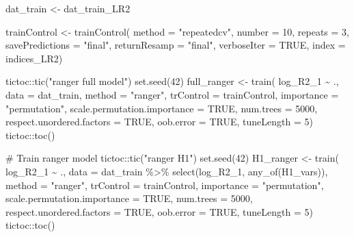 \documentclass[
  letterpaper,
  DIV=11,
  numbers=noendperiod]{scrreprt}
\newenvironment{Shaded}{\begin{snugshade}}{\end{snugshade}}
\newcommand{\AttributeTok}[1]{\textcolor[rgb]{0.40,0.45,0.13}{#1}}
\newcommand{\CommentTok}[1]{\textcolor[rgb]{0.37,0.37,0.37}{#1}}
\newcommand{\ConstantTok}[1]{\textcolor[rgb]{0.56,0.35,0.01}{#1}}
\newcommand{\DecValTok}[1]{\textcolor[rgb]{0.68,0.00,0.00}{#1}}
\newcommand{\FunctionTok}[1]{\textcolor[rgb]{0.28,0.35,0.67}{#1}}
\newcommand{\NormalTok}[1]{\textcolor[rgb]{0.00,0.23,0.31}{#1}}
\newcommand{\OtherTok}[1]{\textcolor[rgb]{0.00,0.23,0.31}{#1}}
\newcommand{\SpecialCharTok}[1]{\textcolor[rgb]{0.37,0.37,0.37}{#1}}
\newcommand{\StringTok}[1]{\textcolor[rgb]{0.13,0.47,0.30}{#1}}
\begin{document}
\begin{Shaded}
\begin{Highlighting}[]
\NormalTok{dat\_train }\OtherTok{\textless{}{-}}\NormalTok{ dat\_train\_LR2}

\NormalTok{trainControl }\OtherTok{\textless{}{-}} \FunctionTok{trainControl}\NormalTok{(}
    \AttributeTok{method =} \StringTok{"repeatedcv"}\NormalTok{,}
    \AttributeTok{number =} \DecValTok{10}\NormalTok{,}
    \AttributeTok{repeats =} \DecValTok{3}\NormalTok{,}
    \AttributeTok{savePredictions =} \StringTok{"final"}\NormalTok{,}
    \AttributeTok{returnResamp =} \StringTok{"final"}\NormalTok{,}
    \AttributeTok{verboseIter =} \ConstantTok{TRUE}\NormalTok{,}
    \AttributeTok{index =}\NormalTok{ indices\_LR2)}

\NormalTok{tictoc}\SpecialCharTok{::}\FunctionTok{tic}\NormalTok{(}\StringTok{"ranger full model"}\NormalTok{)}
\FunctionTok{set.seed}\NormalTok{(}\DecValTok{42}\NormalTok{)}
\NormalTok{full\_ranger }\OtherTok{\textless{}{-}} \FunctionTok{train}\NormalTok{(}
\NormalTok{    log\_R2\_1 }\SpecialCharTok{\textasciitilde{}}\NormalTok{ .,}
    \AttributeTok{data =}\NormalTok{ dat\_train,}
    \AttributeTok{method =} \StringTok{"ranger"}\NormalTok{,}
    \AttributeTok{trControl =}\NormalTok{ trainControl,}
    \AttributeTok{importance =} \StringTok{"permutation"}\NormalTok{,}
    \AttributeTok{scale.permutation.importance =} \ConstantTok{TRUE}\NormalTok{,}
    \AttributeTok{num.trees =} \DecValTok{5000}\NormalTok{,}
    \AttributeTok{respect.unordered.factors =} \ConstantTok{TRUE}\NormalTok{,}
    \AttributeTok{oob.error =} \ConstantTok{TRUE}\NormalTok{,}
    \AttributeTok{tuneLength =} \DecValTok{5}\NormalTok{)}
\NormalTok{tictoc}\SpecialCharTok{::}\FunctionTok{toc}\NormalTok{()}


\CommentTok{\# Train ranger model}
\NormalTok{tictoc}\SpecialCharTok{::}\FunctionTok{tic}\NormalTok{(}\StringTok{"ranger H1"}\NormalTok{)}
\FunctionTok{set.seed}\NormalTok{(}\DecValTok{42}\NormalTok{)}
\NormalTok{H1\_ranger }\OtherTok{\textless{}{-}} \FunctionTok{train}\NormalTok{(}
\NormalTok{    log\_R2\_1 }\SpecialCharTok{\textasciitilde{}}\NormalTok{ .,}
    \AttributeTok{data =}\NormalTok{ dat\_train }\SpecialCharTok{\%\textgreater{}\%} \FunctionTok{select}\NormalTok{(log\_R2\_1, }\FunctionTok{any\_of}\NormalTok{(H1\_vars)),}
    \AttributeTok{method =} \StringTok{"ranger"}\NormalTok{,}
    \AttributeTok{trControl =}\NormalTok{ trainControl,}
    \AttributeTok{importance =} \StringTok{"permutation"}\NormalTok{,}
    \AttributeTok{scale.permutation.importance =} \ConstantTok{TRUE}\NormalTok{,}
    \AttributeTok{num.trees =} \DecValTok{5000}\NormalTok{,}
    \AttributeTok{respect.unordered.factors =} \ConstantTok{TRUE}\NormalTok{,}
    \AttributeTok{oob.error =} \ConstantTok{TRUE}\NormalTok{,}
    \AttributeTok{tuneLength =} \DecValTok{5}\NormalTok{)}
\NormalTok{tictoc}\SpecialCharTok{::}\FunctionTok{toc}\NormalTok{()}



\end{Highlighting}
\end{Shaded}
\end{document}
